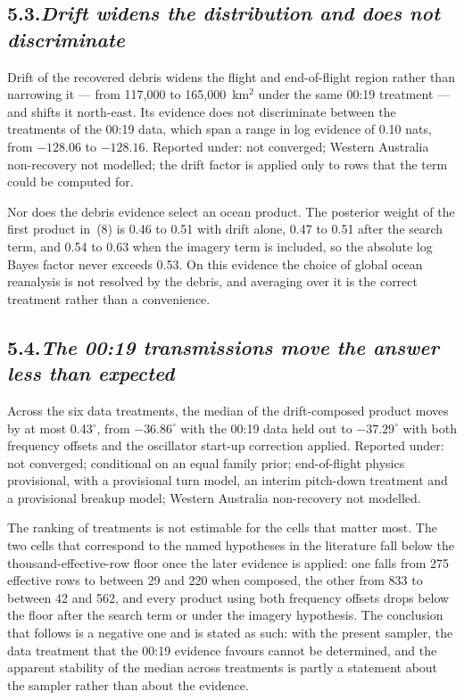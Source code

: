 \documentclass[12pt,a4paper]{article}
\begin{document}
\subsection*{5.3.\quad \textit{Drift widens the distribution and does not discriminate}}

Drift of the recovered debris widens the flight and end-of-flight region rather than narrowing
it --- from 117{,}000 to 165{,}000~km$^2$ under the same 00:19 treatment --- and shifts it
north-east. Its evidence does not discriminate between the treatments of the 00:19 data, which
span a range in log evidence of 0.10 nats, from $-128.06$ to $-128.16$. Reported under: not
converged; Western Australia non-recovery not modelled; the drift factor is applied only to rows
that the term could be computed for.

Nor does the debris evidence select an ocean product. The posterior weight of the first product
in~(8) is 0.46 to 0.51 with drift alone, 0.47 to 0.51 after the search term, and 0.54 to 0.63
when the imagery term is included, so the absolute log Bayes factor never exceeds 0.53. On this
evidence the choice of global ocean reanalysis is not resolved by the debris, and averaging over
it is the correct treatment rather than a convenience.

\subsection*{5.4.\quad \textit{The 00:19 transmissions move the answer less than expected}}

Across the six data treatments, the median of the drift-composed product moves by at most
0.43$^\circ$, from $-36.86^\circ$ with the 00:19 data held out to $-37.29^\circ$ with both
frequency offsets and the oscillator start-up correction applied. Reported under: not converged;
conditional on an equal family prior; end-of-flight physics provisional, with a provisional
turn model, an interim pitch-down treatment and a provisional breakup model; Western Australia
non-recovery not modelled.

The ranking of treatments is not estimable for the cells that matter most. The two cells that
correspond to the named hypotheses in the literature fall below the thousand-effective-row floor
once the later evidence is applied: one falls from 275 effective rows to between 29 and 220 when
composed, the other from 833 to between 42 and 562, and every product using both frequency
offsets drops below the floor after the search term or under the imagery hypothesis. The
conclusion that follows is a negative one and is stated as such: with the present sampler, the
data treatment that the 00:19 evidence favours cannot be determined, and the apparent stability
of the median across treatments is partly a statement about the sampler rather than about the
evidence.
\end{document}
